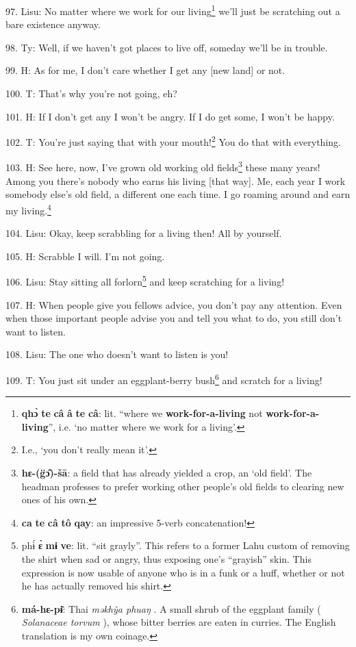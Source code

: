 97. Lisu: No matter where we work for our living\footnote{\textbf{qhɔ̀} \textbf{te} \textbf{câ} \textbf{â} \textbf{te} \textbf{câ}: lit. ``where we \textbf{work-for-a-living} not \textbf{work-for-a-living}'', i.e. `no matter where we work for a living'.} we'll just be scratching out
a bare existence anyway.

98. Ty: Well, if we haven't got places to live off, someday we'll be in trouble.

99. H: As for me, I don't care whether I get any [new land] or not.

100. T: That's why you're not going, eh?

101. H: If I don't get any I won't be angry. If I do get some, I won't be happy.

102. T: You're just saying that with your mouth!\footnote{I.e., `you don't really mean it'.} You do that with everything.

103. H: See here, now, I've grown old working old fields\footnote{\textbf{hɛ-(g̈ɔ̂)-šā}: a field that has already yielded a crop, an `old field'. The headman professes to prefer working other people's old fields to clearing new ones of his own.} these many years! Among
you there's nobody who earns his living [that way]. Me, each year I work somebody
else's old field, a different one each time. I go roaming around and earn my living.\footnote{\textbf{ca} \textbf{te} \textbf{câ} \textbf{tô} \textbf{qay}: an impressive 5-verb concatenation!}

104. Lisu: Okay, keep scrabbling for a living then! All by yourself.

105. H: Scrabble I will. I'm not going.

106. Lisu: Stay sitting all forlorn\footnote{phɨ́ \textbf{ɛ̀} \textbf{mɨ} \textbf{ve}: lit. ``sit grayly''. This refers to a former Lahu custom of removing the shirt when sad or angry, thus exposing one's ``grayish'' skin. This expression is now usable of anyone who is in a funk or a huff, whether or not he has actually removed his shirt.} and keep scratching for a living!

107. H: When people give you fellows advice, you don't pay any attention. Even when
those important people advise you and tell you what to do, you still don't want
to listen.

108. Lisu: The one who doesn't want to listen is you!

109. T: You just sit under an eggplant-berry bush\footnote{\textbf{má-hɛ-pɨ̄}: Thai \textit{məkhy̌a phuaŋ} . A small shrub of the eggplant family ( \textit{Solanaceae torvum} ), whose bitter berries are eaten in curries. The English translation is my own coinage.} and scratch for a living!

